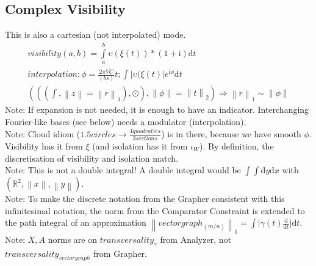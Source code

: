 \documentclass{report}
\newcommand\norm[1]{\left\lVert#1\right\rVert}
\begin{document}
\subsection{Complex Visibility}
This is also a cartesian (not interpolated) mode.
\begin{align}
visibility(a,b)=\int \limits _{a}^{b} \upsilon (\xi (t))*(1+\mathrm{i}) \mathrm{d}t\\
interpolation: \phi = \frac{2\pi\overline{VC}}{(bs)}t; \int \lvert \upsilon (\xi (t)\rvert e^{\mathrm{i}\phi}\mathrm{d}t\\
(((\int,\norm{z}=\norm{r}_1),\odot),\norm{\phi}= \norm{t}_2)\Rightarrow \norm{r}_1 \sim \norm{\phi}
\end{align}
Note: If expansion is not needed, it is enough to have an indicator. Interchanging Fourier-like bases (see below) needs a modulator (interpolation).\\
Note: Cloud idiom ($1.5 circles \rightarrow \frac{4 quadratics}{3 sections}$) is in there, because we have smooth $\phi$. Visibility has it from $\xi$ (and isolation has it from $\iota_{W}$). By definition, the discretisation of visibility and isolation match.\\
Note: This is not a double integral! A double integral would be $\int \int \mathrm{d}y\mathrm{d}x$ with $(\mathbb{R}^2,\norm{x},\norm{y})$.\\
Note: To make the discrete notation from the Grapher consistent with this infinitesimal notation, the norm from the Comparator Constraint is extended to the path integral of an approximation $\norm{vectorgraph_{(m/n)}}_1=\int \lvert \gamma (t) \frac{\mathrm{d}}{\mathrm{d}t} \rvert \mathrm{d}t$.
Note: $X,A$ norms are on $transversality_{\gamma}$ from Analyzer, not $transversality_{vectorgraph}$ from Grapher.
\end{document}
